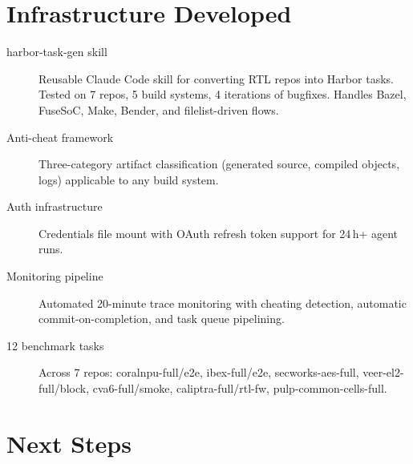 \documentclass[11pt,a4paper]{article}
\begin{document}
\section{Infrastructure Developed}

\begin{description}
\item[harbor-task-gen skill] Reusable Claude Code skill for converting RTL repos into Harbor tasks. Tested on 7 repos, 5 build systems, 4 iterations of bugfixes. Handles Bazel, FuseSoC, Make, Bender, and filelist-driven flows.
\item[Anti-cheat framework] Three-category artifact classification (generated source, compiled objects, logs) applicable to any build system.
\item[Auth infrastructure] Credentials file mount with OAuth refresh token support for 24\,h+ agent runs.
\item[Monitoring pipeline] Automated 20-minute trace monitoring with cheating detection, automatic commit-on-completion, and task queue pipelining.
\item[12 benchmark tasks] Across 7 repos: coralnpu-full/e2e, ibex-full/e2e, secworks-aes-full, veer-el2-full/block, cva6-full/smoke, caliptra-full/rtl-fw, pulp-common-cells-full.
\end{description}

\section{Next Steps}
\end{document}
